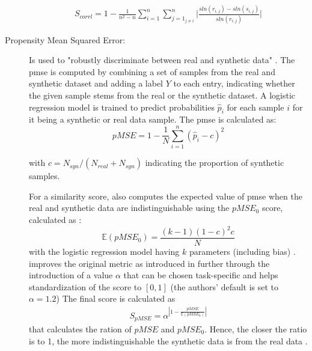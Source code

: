 \begin{description}
  \begin{equation}
    \begin{align}
      \label{eqn:s_corrl}
      S_{corrl} = 1-\frac{1}{n^2-n} \sum_{i=1}^{n}\sum_{j=1_{j \neq i}}^{n} \bigg| \frac{sln(r_{i,j})- sln(s_{i,j})}{sln(r_{i,j})}\bigg| 
      \end{align}
  \end{equation}

  \item[Propensity Mean Squared Error:]
  Is used to "robustly discriminate between real and synthetic data" \cite[p. 3]{chundawat2022UniversalMetricRobust}.
  The \gls{pmse} is computed by combining a set of samples from the real and synthetic dataset and adding a label $Y$ to each entry, 
  indicating whether the given sample stems from the real or the synthetic dataset.
  A logistic regression model is trained to predict probabilities $\hat{p}_i$ for each sample $i$ for it being a synthetic or real data sample.
  The \gls{pmse} is calculated as:
  $$pMSE = 1-\frac{1}{N} \sum_{i=1}^{n}(\hat{p}_i-c)^2$$

  with $c=N_{syn}/(N_{real}+N_{syn})$ indicating the proportion of synthetic samples.
  
  For a similarity score, \cite{chundawat2022UniversalMetricRobust} also computes the expected value of \gls{pmse} when the real and synthetic data are indistinguishable 
  using the $pMSE_0$ score, calculated as \cite{snoke2018GeneralSpecificUtility,chundawat2022UniversalMetricRobust}:
  $$\mathbb{E}(pMSE_0) = \frac{(k-1)(1-c)^2c}{N}$$
  with the logistic regression model having $k$ parameters (including bias) \cite{chundawat2022UniversalMetricRobust}.
  \cite{chundawat2022UniversalMetricRobust} improves the original metric as introduced in \cite{snoke2018GeneralSpecificUtility} further through the introduction
  of a value $\alpha$ that can be chosen task-specific and helps standardization of the score to $[0,1]$ (the authors' default is set to $\alpha=1.2$)
  The final score is calculated as 
  \begin{equation}
    \begin{align*}
      \label{eqn:s_pmse}
      S_{pMSE} = \alpha^{|1-\frac{pMSE}{\mathbb{E}(pMSE_0)}|}
      \end{align*}
  \end{equation}
  that calculates the ration of $pMSE$ and $pMSE_0$.
  Hence, the closer the ratio is to 1, the more indistinguishable the synthetic data is from the real data \cite{chundawat2022UniversalMetricRobust}.
  


\end{description}
